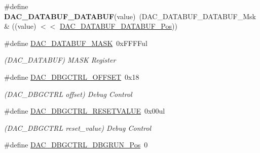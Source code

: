 \begin{DoxyCompactItemize}
\item 
\hypertarget{group___s_a_m_l21___d_a_c_ga4e60504cd02e632151e452ec90fa33ac}{}\#define {\bfseries D\+A\+C\+\_\+\+D\+A\+T\+A\+B\+U\+F\+\_\+\+D\+A\+T\+A\+B\+U\+F}(value)~(D\+A\+C\+\_\+\+D\+A\+T\+A\+B\+U\+F\+\_\+\+D\+A\+T\+A\+B\+U\+F\+\_\+\+Msk \& ((value) $<$$<$ \hyperlink{group___s_a_m_l21___d_a_c_ga3fe3d9c9181741d88429ff03b62828e5}{D\+A\+C\+\_\+\+D\+A\+T\+A\+B\+U\+F\+\_\+\+D\+A\+T\+A\+B\+U\+F\+\_\+\+Pos}))\label{group___s_a_m_l21___d_a_c_ga4e60504cd02e632151e452ec90fa33ac}

\item 
\hypertarget{group___s_a_m_l21___d_a_c_ga09bc5edc17c5afd32066807527a78ba1}{}\#define \hyperlink{group___s_a_m_l21___d_a_c_ga09bc5edc17c5afd32066807527a78ba1}{D\+A\+C\+\_\+\+D\+A\+T\+A\+B\+U\+F\+\_\+\+M\+A\+S\+K}~0x\+F\+F\+F\+Ful\label{group___s_a_m_l21___d_a_c_ga09bc5edc17c5afd32066807527a78ba1}

\begin{DoxyCompactList}\small\item\em (D\+A\+C\+\_\+\+D\+A\+T\+A\+B\+U\+F) M\+A\+S\+K Register \end{DoxyCompactList}\item 
\hypertarget{group___s_a_m_l21___d_a_c_gad921df6ba2692bf586910433879cfc97}{}\#define \hyperlink{group___s_a_m_l21___d_a_c_gad921df6ba2692bf586910433879cfc97}{D\+A\+C\+\_\+\+D\+B\+G\+C\+T\+R\+L\+\_\+\+O\+F\+F\+S\+E\+T}~0x18\label{group___s_a_m_l21___d_a_c_gad921df6ba2692bf586910433879cfc97}

\begin{DoxyCompactList}\small\item\em (D\+A\+C\+\_\+\+D\+B\+G\+C\+T\+R\+L offset) Debug Control \end{DoxyCompactList}\item 
\hypertarget{group___s_a_m_l21___d_a_c_gab17f08ba0800da1162482ada6b8e2624}{}\#define \hyperlink{group___s_a_m_l21___d_a_c_gab17f08ba0800da1162482ada6b8e2624}{D\+A\+C\+\_\+\+D\+B\+G\+C\+T\+R\+L\+\_\+\+R\+E\+S\+E\+T\+V\+A\+L\+U\+E}~0x00ul\label{group___s_a_m_l21___d_a_c_gab17f08ba0800da1162482ada6b8e2624}

\begin{DoxyCompactList}\small\item\em (D\+A\+C\+\_\+\+D\+B\+G\+C\+T\+R\+L reset\+\_\+value) Debug Control \end{DoxyCompactList}\item 
\hypertarget{group___s_a_m_l21___d_a_c_ga942d362f9041cbc6fd9b5d70c04b3eee}{}\#define \hyperlink{group___s_a_m_l21___d_a_c_ga942d362f9041cbc6fd9b5d70c04b3eee}{D\+A\+C\+\_\+\+D\+B\+G\+C\+T\+R\+L\+\_\+\+D\+B\+G\+R\+U\+N\+\_\+\+Pos}~0\label{group___s_a_m_l21___d_a_c_ga942d362f9041cbc6fd9b5d70c04b3eee}


\end{DoxyCompactItemize}

